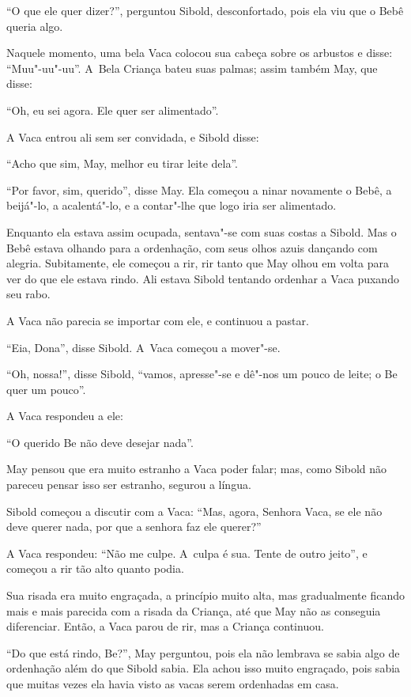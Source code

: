 ``O que ele quer dizer?'', perguntou Sibold, desconfortado, pois ela viu
que o Bebê queria algo.

Naquele momento, uma bela Vaca colocou sua cabeça sobre os arbustos e
disse: ``Muu"-uu"-uu''. A~Bela Criança bateu suas palmas; assim também
May, que disse:

``Oh, eu sei agora. Ele quer ser alimentado''.

A Vaca entrou ali sem ser convidada, e Sibold disse:

``Acho que sim, May, melhor eu tirar leite dela''.

``Por favor, sim, querido'', disse May. Ela começou a ninar novamente o
Bebê, a beijá"-lo, a acalentá"-lo, e a contar"-lhe que logo iria ser
alimentado.

Enquanto ela estava assim ocupada, sentava"-se com suas costas a Sibold.
Mas o Bebê estava olhando para a ordenhação, com seus olhos azuis
dançando com alegria. Subitamente, ele começou a rir, rir tanto que May
olhou em volta para ver do que ele estava rindo. Ali estava Sibold
tentando ordenhar a Vaca puxando seu rabo.

A Vaca não parecia se importar com ele, e continuou a pastar.

``Eia, Dona'', disse Sibold. A~Vaca começou a mover"-se.

``Oh, nossa!'', disse Sibold, ``vamos, apresse"-se e dê"-nos um pouco de
leite; o Be quer um pouco''.

A Vaca respondeu a ele:

``O querido Be não deve desejar nada''.

May pensou que era muito estranho a Vaca poder falar; mas, como Sibold
não pareceu pensar isso ser estranho, segurou a língua.

Sibold começou a discutir com a Vaca: ``Mas, agora, Senhora Vaca, se ele
não deve querer nada, por que a senhora faz ele querer?''

A Vaca respondeu: ``Não me culpe. A~culpa é sua. Tente de outro jeito'',
e começou a rir tão alto quanto podia.

Sua risada era muito engraçada, a princípio muito alta, mas gradualmente
ficando mais e mais parecida com a risada da Criança, até que May não as
conseguia diferenciar. Então, a Vaca parou de rir, mas a Criança
continuou.

``Do que está rindo, Be?'', May perguntou, pois ela não lembrava se
sabia algo de ordenhação além do que Sibold sabia. Ela achou isso muito
engraçado, pois sabia que muitas vezes ela havia visto as vacas serem
ordenhadas em casa.

